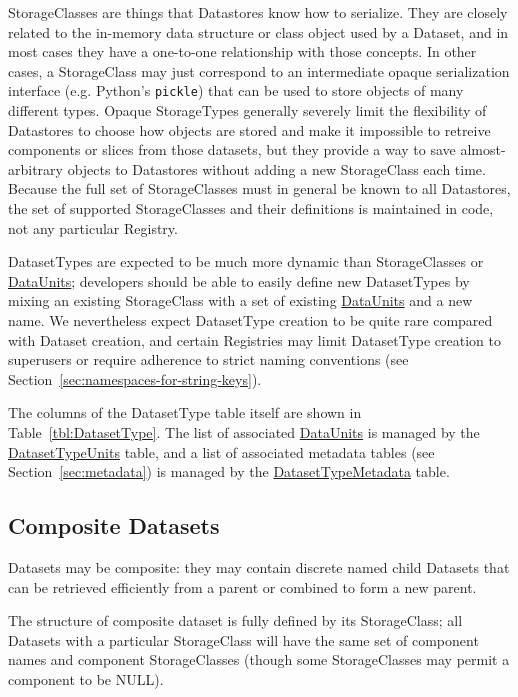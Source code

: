 \documentclass[DM,toc]{lsstdoc}
\newcommand{\tblref}[1]{\hyperref[tbl:#1]{#1}}
\newcommand{\coltable}[1]{
    \begin{table}[htb]
        {
            \footnotesize
            
        }
        \caption{#1 Columns}
        \label{tbl:#1}
    \end{table}
}
\begin{document}
StorageClasses are things that Datastores know how to serialize.
They are closely related to the in-memory data structure or class object used by a Dataset, and in most cases they have a one-to-one relationship with those concepts.
In other cases, a StorageClass may just correspond to an intermediate opaque serialization interface (e.g. Python's \texttt{pickle}) that can be used to store objects of many different types.
Opaque StorageTypes generally severely limit the flexibility of Datastores to choose how objects are stored and make it impossible to retreive components or slices from those datasets, but they provide a way to save almost-arbitrary objects to Datastores without adding a new StorageClass each time.
Because the full set of StorageClasses must in general be known to all Datastores, the set of supported StorageClasses and their definitions is maintained in code, not any particular Registry.

DatasetTypes are expected to be much more dynamic than StorageClasses or \hyperref[sec:dataunits]{DataUnits}; developers should be able to easily define new DatasetTypes by mixing an existing StorageClass with a set of existing \hyperref[sec:dataunits]{DataUnits} and a new name.
We nevertheless expect DatasetType creation to be quite rare compared with Dataset creation, and certain Registries may limit DatasetType creation to superusers or require adherence to strict naming conventions (see Section~\ref{sec:namespaces-for-string-keys}).

The columns of the DatasetType table itself are shown in Table~\ref{tbl:DatasetType}.
The list of associated \hyperref[sec:dataunits]{DataUnits} is managed by the \tblref{DatasetTypeUnits} table, and a list of associated metadata tables (see Section~\ref{sec:metadata}) is managed by the \tblref{DatasetTypeMetadata} table.

\coltable{DatasetType}
\coltable{DatasetTypeUnits}
\coltable{DatasetTypeMetadata}


\subsection{Composite Datasets}
\label{sec:composite-datasets}

Datasets may be composite: they may contain discrete named child Datasets that can be retrieved efficiently from a parent or combined to form a new parent.

The structure of composite dataset is fully defined by its StorageClass; all Datasets with a particular StorageClass will have the same set of component names and component StorageClasses (though some StorageClasses may permit a component to be NULL).
\end{document}
